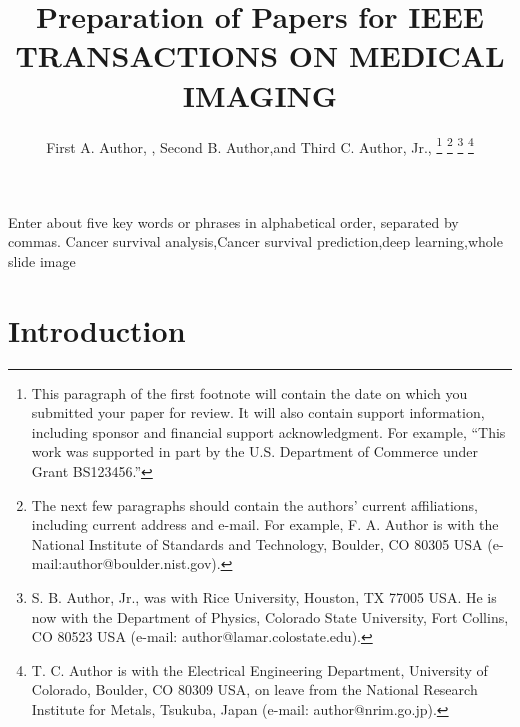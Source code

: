 \documentclass[journal,twoside,web]{ieeecolor}
\begin{document}
\title{Preparation of Papers for IEEE TRANSACTIONS ON MEDICAL IMAGING}
\author{First A. Author, , Second B. Author,and Third C. Author, Jr., 
\thanks{This paragraph of the first footnote will contain the date on which
you submitted your paper for review. It will also contain support information,
including sponsor and financial support acknowledgment. For example, 
``This work was supported in part by the U.S. Department of Commerce under Grant BS123456.'' }
\thanks{The next few paragraphs should contain the authors' current affiliations,
including current address and e-mail. For example, F. A. Author is with the
National Institute of Standards and Technology, Boulder, CO 80305 USA (e-mail:author@boulder.nist.gov). }
\thanks{S. B. Author, Jr., was with Rice University, Houston, TX 77005 USA.
He is now with the Department of Physics, Colorado State University,
Fort Collins, CO 80523 USA (e-mail: author@lamar.colostate.edu).}
\thanks{T. C. Author is with the Electrical Engineering Department,
University of Colorado, Boulder, CO 80309 USA, on leave from the National
Research Institute for Metals, Tsukuba, Japan (e-mail: author@nrim.go.jp).}}

\maketitle

\begin{abstract}

\end{abstract}

\begin{IEEEkeywords}


Enter about five key words or phrases in alphabetical order, separated by commas.
Cancer survival analysis,Cancer survival prediction,deep learning,whole slide image
\end{IEEEkeywords}

\section{Introduction}
\label{sec:introduction}
\end{document}
